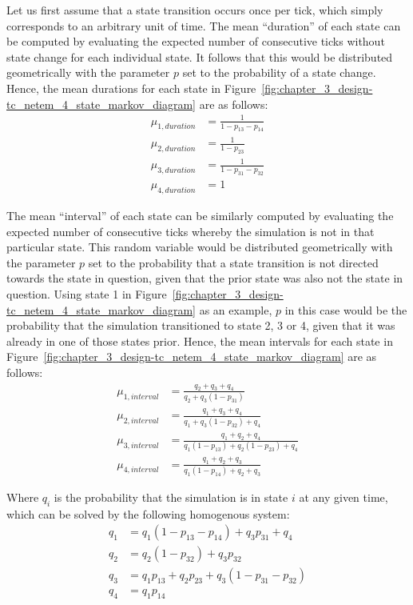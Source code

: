 Let us first assume that a state transition occurs once per tick, which simply corresponds to an arbitrary unit of
time. The mean ``duration'' of each state can be computed by evaluating the expected number of consecutive ticks
without state change for each individual state. It follows that this would be distributed geometrically with the
parameter $p$ set to the probability of a state change. Hence, the mean durations for each state in
Figure~\ref{fig:chapter_3_design-tc_netem_4_state_markov_diagram} are as follows:
\begin{align*}
    \mu_{1,duration} &= \frac{1}{1 - p_{13} - p_{14}} \\
    \mu_{2,duration} &= \frac{1}{1 - p_{23}} \\
    \mu_{3,duration} &= \frac{1}{1 - p_{31} - p_{32}} \\
    \mu_{4,duration} &= 1
\end{align*}

The mean ``interval'' of each state can be similarly computed by evaluating the expected number of consecutive ticks
whereby the simulation is not in that particular state. This random variable would be distributed geometrically with
the parameter $p$ set to the probability that a state transition is not directed towards the state in question,
given that the prior state was also not the state in question. Using state 1 in
Figure~\ref{fig:chapter_3_design-tc_netem_4_state_markov_diagram} as an example, $p$ in this case would be the
probability that the simulation transitioned to state 2, 3 or 4, given that it was already in one of those states
prior. Hence, the mean intervals for each state in Figure~\ref{fig:chapter_3_design-tc_netem_4_state_markov_diagram}
are as follows:
\begin{align*}
    \mu_{1,interval} &= \frac{q_2 + q_3 + q_4}{q_2 + q_3(1 - p_{31})} \\
    \mu_{2,interval} &= \frac{q_1 + q_3 + q_4}{q_1 + q_3(1 - p_{32}) + q_4} \\
    \mu_{3,interval} &= \frac{q_1 + q_2 + q_4}{q_1(1 - p_{13}) + q_2(1 - p_{23}) + q_4} \\
    \mu_{4,interval} &= \frac{q_1 + q_2 + q_3}{q_1(1 - p_{14}) + q_2 + q_3}
\end{align*}

Where $q_i$ is the probability that the simulation is in state $i$ at any given time, which can be solved by the
following homogenous system:
\begin{align*}
    q_1 &= q_1(1 - p_{13} - p_{14}) + q_3p_{31} + q_4 \\
    q_2 &= q_2(1 - p_{32}) + q_3p_{32} \\
    q_3 &= q_1p_{13} + q_2p_{23} + q_3(1 - p_{31} - p_{32}) \\
    q_4 &= q_1p_{14}
\end{align*}

